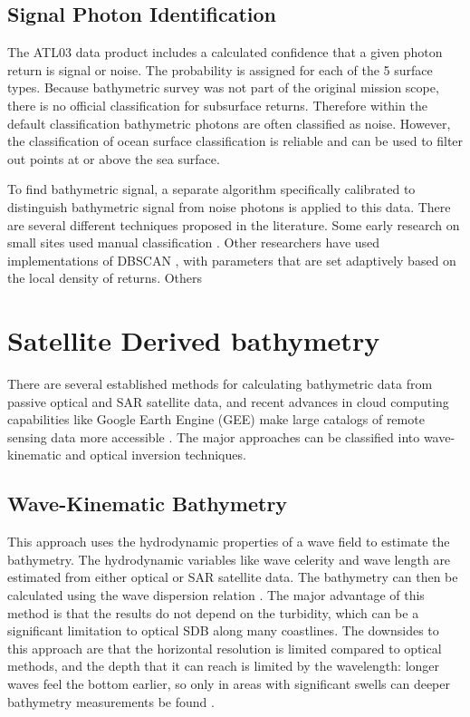 \subsection{Signal Photon Identification}

The ATL03 data product includes a calculated confidence that a given photon return is signal or noise. The probability is assigned for each of the 5 surface types. Because bathymetric survey was not part of the original mission scope, there is no official classification for subsurface returns. Therefore within the default classification bathymetric photons are often classified as noise. However, the classification of ocean surface classification is reliable and can be used to filter out points at or above the sea surface.

To find bathymetric signal, a separate algorithm specifically calibrated to distinguish bathymetric signal from noise photons is applied to this data. There are several different techniques proposed in the literature. Some early research on small sites used manual classification \parencite{Forfinski-Sarkozi2016}. Other researchers have used implementations of DBSCAN \parencite{Ester1996}, with parameters that are set adaptively based on the local density of returns. Others


\section{Satellite Derived bathymetry}
There are several established methods for calculating bathymetric data from passive optical and SAR satellite data, and recent advances in cloud computing capabilities like Google Earth Engine (GEE) \parencite{Gorelick2017a} make large catalogs of remote sensing data more accessible \parencite{Pike2019,Turner2021}. The major approaches can be classified into wave-kinematic and optical inversion techniques.

\subsection{Wave-Kinematic Bathymetry}
This approach uses the hydrodynamic properties of a wave field to estimate the bathymetry. The hydrodynamic variables like wave celerity and wave length are estimated from either optical or SAR satellite data. The bathymetry can then be calculated using the wave dispersion relation \cite{Almar2021e}. The major advantage of this method is that the results do not depend on the turbidity, which can be a significant limitation to optical SDB along many coastlines. The downsides to this approach are that the horizontal resolution is limited compared to optical methods, and the depth that it can reach is limited by the wavelength: longer waves feel the bottom earlier, so only in areas with significant swells can deeper bathymetry measurements be found \parencite{Almar2021e}.

